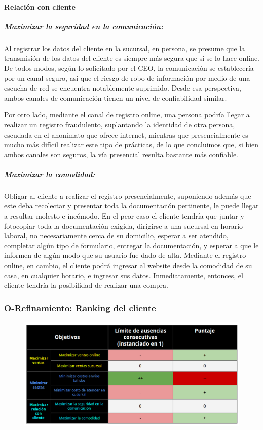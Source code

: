 \paragraph{Relación con cliente}

\subparagraph{Maximizar la seguridad en la comunicación:}

Al registrar los datos del cliente en la sucursal, en persona, se presume que la
transmisión de los datos del cliente es siempre más segura que si se lo hace
online. De todos modos, según lo solicitado por el CEO, la comunicación se
establecería por un canal seguro, así que el riesgo de robo de información por
medio de una escucha de red se encuentra notablemente suprimido. Desde esa
perspectiva, ambos canales de comunicación tienen un nivel de confiabilidad
similar.

Por otro lado, mediante el canal de registro online, una persona podría llegar a
realizar un registro fraudulento, suplantando la identidad de otra persona,
escudada en el anonimato que ofrece internet, mientras que presencialmente es
mucho más difícil realizar este tipo de prácticas, de lo que concluimos que, si
bien ambos canales son seguros, la vía presencial resulta bastante más
confiable.

\subparagraph{Maximizar la comodidad:}

Obligar al cliente a realizar el registro presencialmente, suponiendo además que
este deba recolectar y presentar toda la documentación pertinente, le puede
llegar a resultar molesto e incómodo. En el peor caso el cliente tendría que
juntar y fotocopiar toda la documentación exigida, dirigirse a una sucursal en
horario laboral, no necesariamente cerca de su domicilio, esperar a ser
atendido, completar algún tipo de formulario, entregar la documentación, y
esperar a que le informen de algún modo que su usuario fue dado de alta.
Mediante el registro online, en cambio, el cliente podrá ingresar al website
desde la comodidad de su casa, en cualquier horario, e ingresar sus datos.
Inmediatamente, entonces, el cliente tendría la posibilidad de realizar una
compra.

\newpage
\subsubsection{O-Refinamiento: Ranking del cliente}
\begin{figure}[H]
  \includegraphics[width=\linewidth]{images/objetivo-blando-ranking-cliente.png}
\end{figure}

